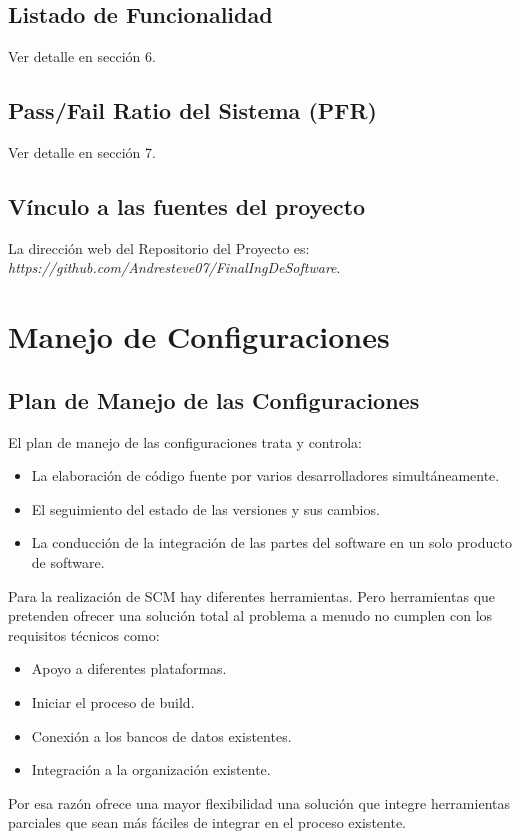 \documentclass[10pt]{article} %
\begin{document}
\subsection{Listado de Funcionalidad}
Ver detalle en sección 6. %

\subsection{Pass/Fail Ratio del Sistema (PFR)}
Ver detalle en sección 7.%

\subsection{Vínculo a las fuentes del proyecto}
La dirección web del Repositorio del Proyecto es: \textit{https://github.com/Andresteve07/FinalIngDeSoftware}.

\section{Manejo de Configuraciones}

\subsection{Plan de Manejo de las Configuraciones}
El plan de manejo de las configuraciones trata y controla:
\begin{itemize}
\item La elaboración de código fuente por varios desarrolladores simultáneamente.
\item El seguimiento del estado de las versiones y sus cambios.
\item La conducción de la integración de las partes del software en un solo producto de software.
\end{itemize}
Para la realización de SCM hay diferentes herramientas. Pero herramientas que pretenden ofrecer una solución total al problema a menudo no cumplen con los requisitos técnicos como:
\begin{itemize}
\item Apoyo a diferentes plataformas.
\item Iniciar el proceso de build.
\item Conexión a los bancos de datos existentes.
\item Integración a la organización existente.
\end{itemize}
Por esa razón ofrece una mayor flexibilidad una solución que integre herramientas parciales que sean más fáciles de integrar en el proceso existente.
\end{document}

